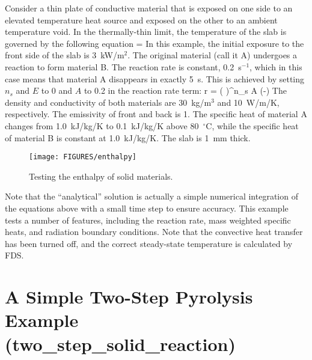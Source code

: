 \documentclass[11pt]{book}
\begin{document}
Consider a thin plate of conductive material that is exposed on one side to an elevated temperature heat source and exposed on the
other to an ambient temperature void. In the thermally-thin limit, the temperature of the slab is governed by the following equation
\be
    = 
\ee
In this example, the initial exposure to the front side of the slab is
3~kW/m$^2$. The original material (call it A) undergoes a reaction to form material B.  The reaction rate is constant, 0.2~s$^{-1}$, which in this
case means that material A disappears in exactly 5~s. This is achieved by setting $n_s$ and $E$ to 0 and $A$ to 0.2 in the reaction rate term:
\be
    r = \left( \right)^{n_{s}}
    A \; \exp \left(-\right)
\ee
The density and conductivity of both materials are
30~kg/m$^3$ and 10~W/m/K, respectively. The emissivity of front and back is 1.  The specific heat of material A changes from
1.0~kJ/kg/K to 0.1~kJ/kg/K above 80~$^\circ$C, while the specific heat of material B is constant at 1.0~kJ/kg/K. The slab is 1~mm thick.

\begin{figure}[ht]
\begin{center}
\texttt{[image: FIGURES/enthalpy]}
\end{center}
\caption[The {\bf enthalpy} test case.]{Testing the enthalpy of solid materials.}
\label{enthalpy}
\end{figure}

\noindent
Note that the ``analytical'' solution is actually a simple numerical integration of the equations above with a small time step to ensure accuracy.
This example tests a number of features, including the reaction rate, mass weighted specific heats, and radiation boundary conditions. Note that the
convective heat transfer has been turned off, and the correct steady-state temperature is calculated by FDS.


\section{A Simple Two-Step Pyrolysis Example (\texorpdfstring{{\bf two\_step\_solid\_reaction}}{two\_step\_solid\_reaction})}
\end{document}
